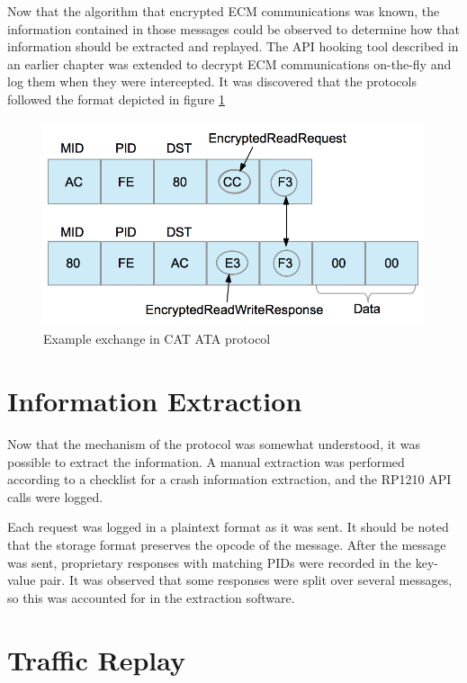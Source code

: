 Now that the algorithm that encrypted ECM communications was known, the information contained in those
messages could be observed to determine how that information should be extracted and replayed. The
API hooking tool described in an earlier chapter was extended to decrypt ECM communications on-the-fly
and log them when they were intercepted. It was discovered that the protocols followed the format depicted
in figure \ref{fig:ataprotocol}

\begin{figure}[h]
  \centering
  \includegraphics{cat-protocol-diagram}
  \caption{Example exchange in CAT ATA protocol}
  \label{fig:ataprotocol}
\end{figure}

\section{Information Extraction}

Now that the mechanism of the protocol was somewhat understood, it was possible to extract the information.
A manual extraction was performed according to a checklist for a crash information extraction, and the 
RP1210 API calls were logged.

Each request was logged in a plaintext format as it was sent. 
It should be noted that the storage format preserves the opcode of the message. After the message was sent, proprietary
responses with matching PIDs were recorded in the key-value pair. It was observed that some responses were split over
several messages, so this was accounted for in the extraction software.

\section{Traffic Replay}



